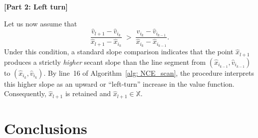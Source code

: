 \documentclass[12pt]{article}
\newcommand{\qVecVar}{\mathbf{q}}
\begin{document}


\textbf{[Part 2: Left turn]}

Let us now assume that
%
\begin{equation}\label{eq:lt_slope}
    \frac{\hat{v}_{l+1} - \hat{v}_{i_{k}}}{\hat{x}_{l+1} - \hat{x}_{i_{k}}}
    \;>\;
    \frac{\hat{v}_{i_{k}} - \hat{v}_{i_{k-1}}}{\hat{x}_{i_{k}}-\hat{x}_{i_{k-1}}}.
\end{equation}
%
Under this condition, a standard slope comparison indicates that the point $\hat{x}_{l+1}$ produces a strictly \emph{higher} secant slope than the line segment from $(\hat{x}_{i_{k-1}}, \hat{v}_{i_{k-1}})$ to $(\hat{x}_{i_{k}}, \hat{v}_{i_{k}})$.  
By line~16 of Algorithm~\ref{alg: NCE_scan}, the procedure interprets this higher slope as an upward or ``left-turn'' increase in the value function.  
Consequently, $\hat{x}_{l+1}$ is retained and $\hat{x}_{l+1}\in \mathbb{X}$.



\section{Conclusions}
\end{document}
